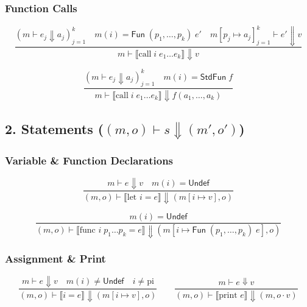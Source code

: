 \documentclass[11pt,a4paper]{article}
\begin{document}
\subsubsection*{Function Calls}
\begin{equation*}
\frac{(m \vdash e_j \Downarrow a_j)_{j=1}^k \quad m(i) = \mathsf{Fun}\;(p_1,\ldots,p_k)\;e' \quad m[p_j \mapsto a_j]_{j=1}^k \vdash e' \Downarrow v}{m \vdash \llbracket \text{call}\;i\;e_1\ldots e_k \rrbracket \Downarrow v}
\end{equation*}

\begin{equation*}
\frac{(m \vdash e_j \Downarrow a_j)_{j=1}^k \quad m(i) = \mathsf{StdFun}\;f}{m \vdash \llbracket \text{call}\;i\;e_1\ldots e_k \rrbracket \Downarrow f(a_1,\ldots,a_k)}
\end{equation*}

\newpage
\subsection*{2. Statements ($(m,o) \vdash s \Downarrow (m',o')$)}

\subsubsection*{Variable \& Function Declarations}
\begin{equation*}
\frac{m \vdash e \Downarrow v \quad m(i) = \mathsf{Undef}}{(m,o) \vdash \llbracket \text{let } i = e \rrbracket \Downarrow (m[i \mapsto v], o)}
\end{equation*}

\begin{equation*}
\frac{m(i) = \mathsf{Undef}}{(m,o) \vdash \llbracket \text{func } i\;p_1\ldots p_k = e \rrbracket \Downarrow (m[i \mapsto \mathsf{Fun}\;(p_1,\ldots,p_k)\;e], o)}
\end{equation*}

\subsubsection*{Assignment \& Print}
\begin{equation*}
\frac{m \vdash e \Downarrow v \quad m(i) \neq \mathsf{Undef} \quad i \neq \text{pi}}{(m,o) \vdash \llbracket i = e \rrbracket \Downarrow (m[i \mapsto v], o)}
\qquad
\frac{m \vdash e \Downarrow v}{(m,o) \vdash \llbracket \text{print } e \rrbracket \Downarrow (m, o \cdot v)}
\end{equation*}
\end{document}
